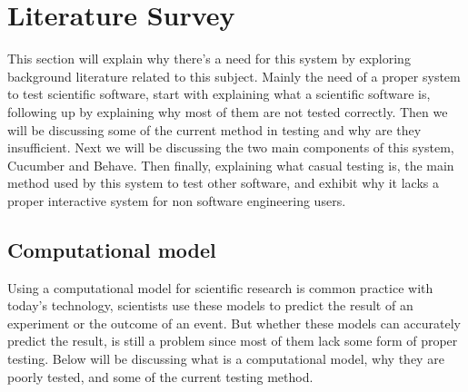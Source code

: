 \chapter{Literature Survey}

This section will explain why there’s a need for this system by exploring background literature related to this subject. Mainly the need of a proper system to test scientific software, start with explaining what a scientific software is, following up by explaining why most of them are not tested correctly. Then we will be discussing some of the current method in testing and why are they insufficient. Next we will be discussing the two main components of this system, Cucumber and Behave. Then finally, explaining what casual testing is, the main method used by this system to test other software, and exhibit why it lacks a proper interactive system for non software engineering users. 

\section{Computational model}
Using a computational model for scientific research is common practice with today’s technology, scientists use these models to predict the result of an experiment or the outcome of an event. But whether these models can accurately predict the result, is still a problem since most of them lack some form of proper testing. Below will be discussing what is a computational model, why they are poorly tested, and some of the current testing method.
